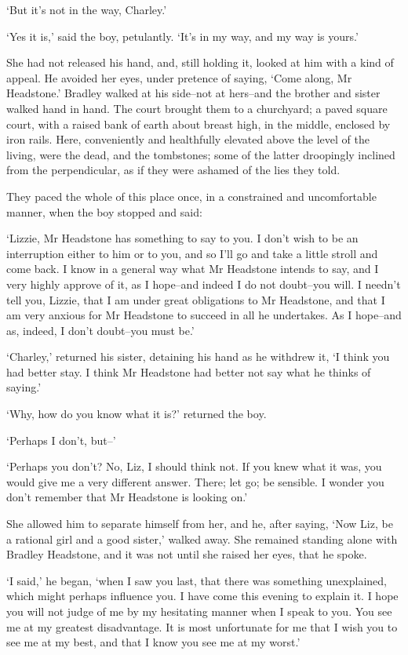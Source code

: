 ‘But it’s not in the way, Charley.’

‘Yes it is,’ said the boy, petulantly. ‘It’s in my way, and my way is
yours.’

She had not released his hand, and, still holding it, looked at him with
a kind of appeal. He avoided her eyes, under pretence of saying, ‘Come
along, Mr Headstone.’ Bradley walked at his side--not at hers--and the
brother and sister walked hand in hand. The court brought them to a
churchyard; a paved square court, with a raised bank of earth about
breast high, in the middle, enclosed by iron rails. Here, conveniently
and healthfully elevated above the level of the living, were the dead,
and the tombstones; some of the latter droopingly inclined from the
perpendicular, as if they were ashamed of the lies they told.

They paced the whole of this place once, in a constrained and
uncomfortable manner, when the boy stopped and said:

‘Lizzie, Mr Headstone has something to say to you. I don’t wish to be an
interruption either to him or to you, and so I’ll go and take a little
stroll and come back. I know in a general way what Mr Headstone intends
to say, and I very highly approve of it, as I hope--and indeed I do
not doubt--you will. I needn’t tell you, Lizzie, that I am under great
obligations to Mr Headstone, and that I am very anxious for Mr Headstone
to succeed in all he undertakes. As I hope--and as, indeed, I don’t
doubt--you must be.’

‘Charley,’ returned his sister, detaining his hand as he withdrew it, ‘I
think you had better stay. I think Mr Headstone had better not say what
he thinks of saying.’

‘Why, how do you know what it is?’ returned the boy.

‘Perhaps I don’t, but--’

‘Perhaps you don’t? No, Liz, I should think not. If you knew what
it was, you would give me a very different answer. There; let go; be
sensible. I wonder you don’t remember that Mr Headstone is looking on.’

She allowed him to separate himself from her, and he, after saying, ‘Now
Liz, be a rational girl and a good sister,’ walked away. She remained
standing alone with Bradley Headstone, and it was not until she raised
her eyes, that he spoke.

‘I said,’ he began, ‘when I saw you last, that there was something
unexplained, which might perhaps influence you. I have come this evening
to explain it. I hope you will not judge of me by my hesitating manner
when I speak to you. You see me at my greatest disadvantage. It is most
unfortunate for me that I wish you to see me at my best, and that I know
you see me at my worst.’

